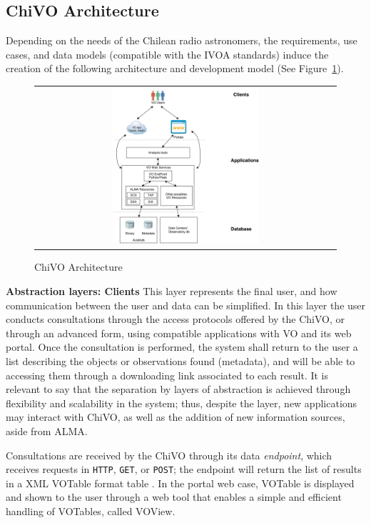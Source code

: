 \documentclass[]{spie}
\begin{document}
\subsection{ChiVO Architecture}
Depending on the needs of the Chilean radio astronomers, the requirements, use
cases, and data models (compatible with the IVOA standards) induce the creation
of the following architecture and development model (See
Figure~\ref{fig:chivoarch}).

\begin{figure}
   \begin{center}
   \begin{tabular}{c}
   \includegraphics[width=0.5\textwidth]{images/chivo_capas.png}
   \end{tabular}
   \end{center}
   \caption[example]
   { \label{fig:chivoarch} ChiVO Architecture}
\end{figure}

\textbf{Abstraction layers:  Clients}
This layer represents the final user, and how communication between the user
and data can be simplified.  In this layer the user conducts consultations
through the access protocols offered by the ChiVO, or through an advanced form,
using compatible applications with VO and its web portal.  Once the
consultation is performed, the system shall return to the user a list
describing the objects or observations found (metadata), and will be able to
accessing them through a downloading link associated to each result.  It is
relevant to say that the separation by layers of abstraction is achieved
through flexibility and scalability in the system; thus, despite the layer, new
applications may interact with ChiVO, as well as the addition of new
information sources, aside from ALMA.

Consultations are received by the ChiVO through its data \emph{endpoint}, which
receives requests in \texttt{HTTP}, \texttt{GET}, or \texttt{POST}; the
endpoint will return the list of results in a XML VOTable format table
\cite{ochsenbein2011ivoa}.  In the portal web case, VOTable is displayed and
shown to the user through a web tool that enables a simple and efficient
handling of VOTables, called VOView.
\end{document}
